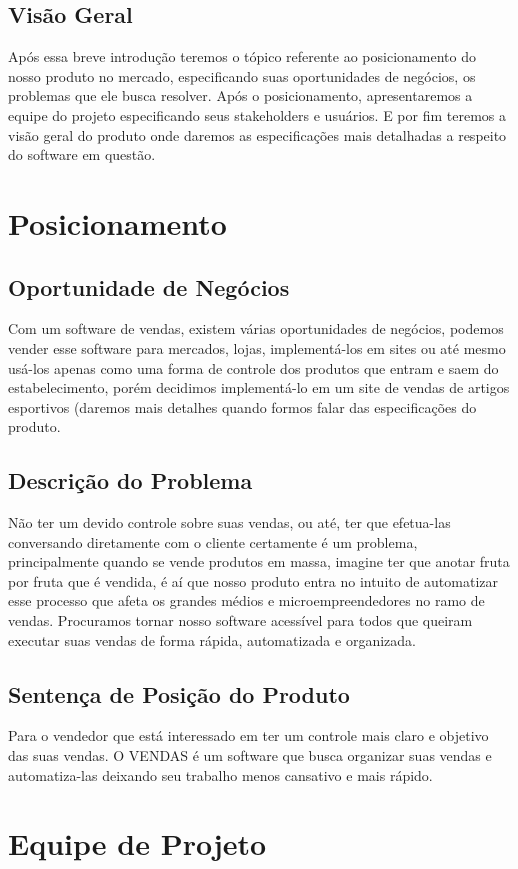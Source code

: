 \documentclass{article}
\begin{document}
\subsection{Visão Geral} 
Após essa breve introdução teremos o tópico referente ao posicionamento do nosso produto no mercado, especificando suas oportunidades de negócios, os problemas que ele busca resolver. Após o posicionamento, apresentaremos a equipe do projeto especificando seus stakeholders e usuários. E por fim teremos a visão geral do produto onde daremos as especificações mais detalhadas a respeito do software em questão.
 
\section{Posicionamento}
\subsection{Oportunidade de Negócios}
Com um software de vendas, existem várias oportunidades de negócios, podemos vender esse software para mercados, lojas, implementá-los em sites ou até mesmo usá-los apenas como uma forma de controle dos produtos que entram e saem do estabelecimento, porém decidimos implementá-lo em um site de vendas de artigos esportivos (daremos mais detalhes quando formos falar das especificações do produto.
\subsection{Descrição do Problema}
Não ter um devido controle sobre suas vendas, ou até, ter que efetua-las conversando diretamente com o cliente certamente é um problema, principalmente quando se vende produtos em massa, imagine ter que anotar fruta por fruta que é vendida, é aí que nosso produto entra no intuito de automatizar esse processo que afeta os grandes médios e microempreendedores no ramo de vendas. Procuramos tornar nosso software acessível para todos que queiram executar suas vendas de forma rápida, automatizada e organizada.
\subsection{Sentença de Posição do Produto}
Para o vendedor que está interessado em ter um controle mais claro e objetivo das suas vendas. O VENDAS é um software que busca organizar suas vendas e automatiza-las deixando seu trabalho menos cansativo e mais rápido.
\section{Equipe de Projeto}
\end{document}
